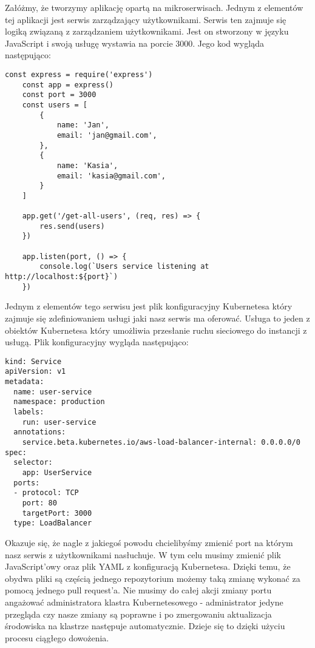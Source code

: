 \par
Załóżmy, że tworzymy aplikację opartą na mikroserwisach. Jednym z elementów tej aplikacji jest serwis zarządzający użytkownikami. Serwis ten zajmuje się logiką związaną z zarządzaniem użytkownikami. Jest on stworzony w języku JavaScript i swoją usługę wystawia na porcie 3000. Jego kod wygląda następująco:
\begin{lstlisting}[caption={Serwis zarządzający użytkownikami}]
    const express = require('express')
    const app = express()
    const port = 3000
    const users = [
        {
            name: 'Jan',
            email: 'jan@gmail.com',
        }, 
        {
            name: 'Kasia',
            email: 'kasia@gmail.com',
        }
    ]
    
    app.get('/get-all-users', (req, res) => {
        res.send(users)
    })
    
    app.listen(port, () => {
        console.log(`Users service listening at http://localhost:${port}`)
    })
\end{lstlisting}
Jednym z elementów tego serwisu jest plik konfiguracyjny Kubernetesa który zajmuje się zdefiniowaniem usługi jaki nasz serwis ma oferować. Usługa to jeden z obiektów Kubernetesa który umożliwia przesłanie ruchu sieciowego do instancji z usługą. Plik konfiguracyjny wygląda następująco:
\begin{lstlisting}
kind: Service
apiVersion: v1
metadata:
  name: user-service
  namespace: production
  labels:
    run: user-service
  annotations:
    service.beta.kubernetes.io/aws-load-balancer-internal: 0.0.0.0/0
spec:
  selector:
    app: UserService
  ports:
  - protocol: TCP
    port: 80
    targetPort: 3000
  type: LoadBalancer
\end{lstlisting}
Okazuje się, że nagle z jakiegoś powodu chcielibyśmy zmienić port na którym nasz serwis z użytkownikami nasłuchuje. W tym celu musimy zmienić plik JavaScript'owy oraz plik YAML z konfiguracją Kubernetesa. Dzięki temu, że obydwa pliki są częścią jednego repozytorium możemy taką zmianę wykonać za pomocą jednego pull request'a. Nie musimy do całej akcji zmiany portu angażować administratora klastra Kubernetesowego - administrator jedyne przegląda czy nasze zmiany są poprawne i po zmergowaniu aktualizacja środowiska na klastrze następuje automatycznie. Dzieje się to dzięki użyciu procesu ciągłego dowożenia.
